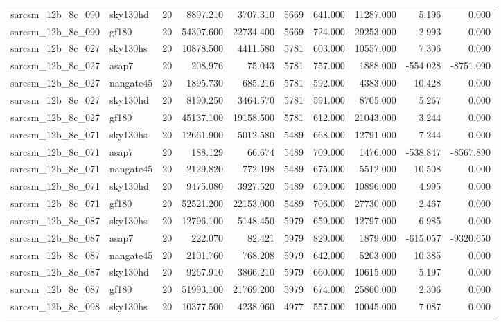 \documentclass{article}
\begin{document}
\begin{longtable}{llrrrrrrrr}
sarcsm\_12b\_8c\_090 & sky130hd & 20 & 8897.210 & 3707.310 & 5669 & 641.000 & 11287.000 & 5.196 & 0.000 \\
sarcsm\_12b\_8c\_090 & gf180 & 20 & 54307.600 & 22734.400 & 5669 & 724.000 & 29253.000 & 2.993 & 0.000 \\
sarcsm\_12b\_8c\_027 & sky130hs & 20 & 10878.500 & 4411.580 & 5781 & 603.000 & 10557.000 & 7.306 & 0.000 \\
sarcsm\_12b\_8c\_027 & asap7 & 20 & 208.976 & 75.043 & 5781 & 757.000 & 1888.000 & -554.028 & -8751.090 \\
sarcsm\_12b\_8c\_027 & nangate45 & 20 & 1895.730 & 685.216 & 5781 & 592.000 & 4383.000 & 10.428 & 0.000 \\
sarcsm\_12b\_8c\_027 & sky130hd & 20 & 8190.250 & 3464.570 & 5781 & 591.000 & 8705.000 & 5.267 & 0.000 \\
sarcsm\_12b\_8c\_027 & gf180 & 20 & 45137.100 & 19158.500 & 5781 & 612.000 & 21043.000 & 3.244 & 0.000 \\
sarcsm\_12b\_8c\_071 & sky130hs & 20 & 12661.900 & 5012.580 & 5489 & 668.000 & 12791.000 & 7.244 & 0.000 \\
sarcsm\_12b\_8c\_071 & asap7 & 20 & 188.129 & 66.674 & 5489 & 709.000 & 1476.000 & -538.847 & -8567.890 \\
sarcsm\_12b\_8c\_071 & nangate45 & 20 & 2129.820 & 772.198 & 5489 & 675.000 & 5512.000 & 10.508 & 0.000 \\
sarcsm\_12b\_8c\_071 & sky130hd & 20 & 9475.080 & 3927.520 & 5489 & 659.000 & 10896.000 & 4.995 & 0.000 \\
sarcsm\_12b\_8c\_071 & gf180 & 20 & 52521.200 & 22153.000 & 5489 & 706.000 & 27730.000 & 2.467 & 0.000 \\
sarcsm\_12b\_8c\_087 & sky130hs & 20 & 12796.100 & 5148.450 & 5979 & 659.000 & 12797.000 & 6.985 & 0.000 \\
sarcsm\_12b\_8c\_087 & asap7 & 20 & 222.070 & 82.421 & 5979 & 829.000 & 1879.000 & -615.057 & -9320.650 \\
sarcsm\_12b\_8c\_087 & nangate45 & 20 & 2101.760 & 768.208 & 5979 & 642.000 & 5203.000 & 10.385 & 0.000 \\
sarcsm\_12b\_8c\_087 & sky130hd & 20 & 9267.910 & 3866.210 & 5979 & 660.000 & 10615.000 & 5.197 & 0.000 \\
sarcsm\_12b\_8c\_087 & gf180 & 20 & 51993.100 & 21769.200 & 5979 & 674.000 & 25860.000 & 2.306 & 0.000 \\
sarcsm\_12b\_8c\_098 & sky130hs & 20 & 10377.500 & 4238.960 & 4977 & 557.000 & 10045.000 & 7.087 & 0.000 \\

\end{longtable}
\end{document}
